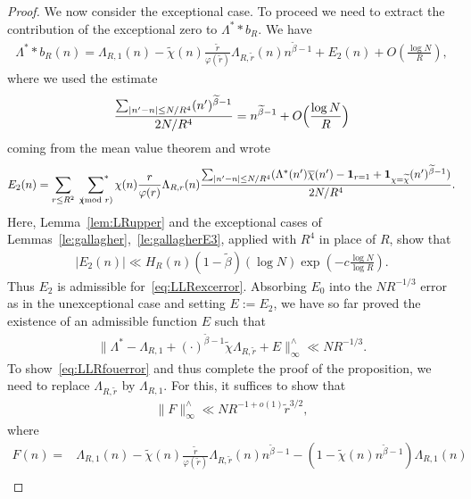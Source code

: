 \documentclass[12pt]{amsart}
\theoremstyle{definition}
\theoremstyle{remark}
\numberwithin{equation}{section}
\newcommand{\asum}{\sideset{}{^{\ast}}\sum}
\newcommand{\1}{\mathbf{1}}
\let\oldpmod\pmod
\renewcommand{\pmod}[1]{\hspace{-0.12cm}\oldpmod {#1}}
\begin{document}
\begin{proof}
 We now consider the exceptional case. To proceed we need to extract the contribution of the exceptional zero to $\Lambda^**b_{R}$. We have
    \begin{align} \label{eq:roughapprLconvb}
        \Lambda^* * b_{R}(n)=\Lambda_{R,1}(n)-\widetilde{\chi}(n)\frac{\widetilde{r}}{\varphi(\widetilde{r})}\Lambda_{R,\widetilde{r}}(n) n^{\widetilde{\beta}-1}+E_2(n)+O\left(\frac{\log N}{R} \right),
    \end{align}
    where we used the estimate
    \begin{align}
        \frac{\sum_{|n'-n|\leq N/R^4 } (n')^{\widetilde{\beta}-1}}{2N/R^4}=n^{\widetilde{\beta}-1}+O\Bigl(\frac{\log N}{R}\Bigr)
    \end{align}
    coming from  the mean value theorem
    and wrote
    \begin{align*}
        E_2(n)=\sum_{r\leq R^2}\,\,\,\asum_{\chi\pmod r}  \chi(n)\frac{r}{\varphi(r)} \Lambda_{R,r}(n) \frac{\sum_{|n'-n|\leq N/R^4 } (\Lambda^*(n')\overline{\chi}(n')-\1_{r=1}+\1_{\chi=\widetilde{\chi}}(n')^{\widetilde{\beta}-1})}{2N/R^4}.
    \end{align*}
    Here, Lemma~\ref{lem:LRupper} and the exceptional cases of Lemmas~\ref{le:gallagher},~\ref{le:gallagherE3}, applied with $R^4$ in place of $R$, show that
    \begin{align*}
         |E_2(n)|\ll H_R(n) (1-\widetilde{\beta}) (\log N)\exp\left(-c \frac{\log N}{\log R}\right).
    \end{align*}
    Thus $E_2$ is admissible for~\eqref{eq:LLRexcerror}. Absorbing $E_0$ into the $NR^{-1/3}$ error as in the unexceptional case and setting $E:=E_2$, we have so far proved the existence of an admissible function $E$ such that
    \begin{align*}
        \| \Lambda^*-\Lambda_{R,1}+(\cdot)^{\widetilde{\beta}-1}\widetilde{\chi}\Lambda_{R,\widetilde{r}}+E\|_{\infty}^{\wedge}\ll N R^{-1/3}.
    \end{align*}
    To show~\eqref{eq:LLRfouerror} and thus complete the proof of the proposition, we need to replace $\Lambda_{R,\widetilde{r}}$ by $\Lambda_{R,1}$. For this, it suffices to show that 
    \begin{align}\label{eq:FFourierbound}
        \|F\|_{\infty}^{\wedge}\ll N R^{-1+o(1)} \widetilde{r}^{3/2},
    \end{align}
    where 
    \begin{align*}
        F(n)=&\Lambda_{R,1}(n)-\widetilde{\chi}(n)\frac{\widetilde{r}}{\varphi(\widetilde{r})}\Lambda_{R,\widetilde{r}}(n) n^{\widetilde{\beta}-1}-(1-\widetilde{\chi}(n)n^{\widetilde{\beta}-1})\Lambda_{R,1}(n)\\

\end{align*}
\end{proof}
\end{document}
